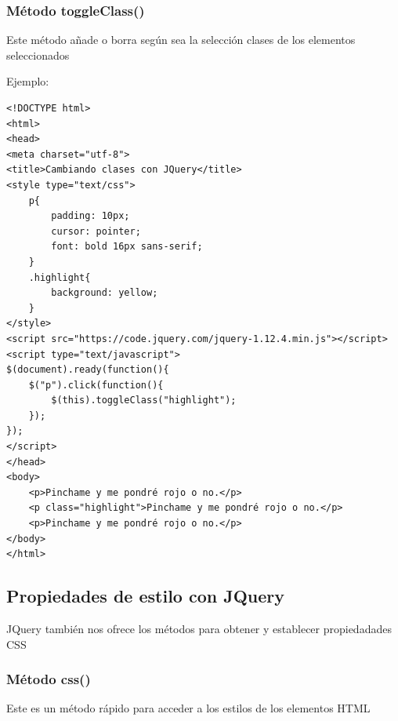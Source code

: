 \documentclass[a4paper, oneside]{article}
\begin{document}
\subsubsection{Método toggleClass()}
\label{sec:org044d77f}

Este método añade o borra según sea la selección clases de los elementos seleccionados

Ejemplo:

\begin{verbatim}
<!DOCTYPE html>
<html>
<head>
<meta charset="utf-8">
<title>Cambiando clases con JQuery</title>
<style type="text/css">
    p{
        padding: 10px;
        cursor: pointer;        
        font: bold 16px sans-serif;
    }
    .highlight{
        background: yellow;
    }         
</style>
<script src="https://code.jquery.com/jquery-1.12.4.min.js"></script>
<script type="text/javascript">
$(document).ready(function(){
    $("p").click(function(){
        $(this).toggleClass("highlight");
    });
});
</script>
</head>
<body>
    <p>Pinchame y me pondré rojo o no.</p>
    <p class="highlight">Pinchame y me pondré rojo o no.</p>
    <p>Pinchame y me pondré rojo o no.</p>
</body>
</html>                                		
\end{verbatim}

\subsection{Propiedades de estilo con JQuery}
\label{sec:org81fed23}

JQuery también nos ofrece los métodos para obtener y establecer propiedadades CSS 

\subsubsection{Método css()}
\label{sec:orgf407101}

Este es un método rápido para acceder a los estilos de los elementos HTML
\end{document}
